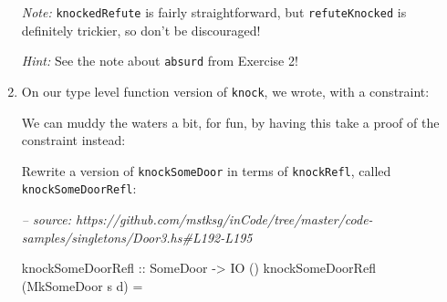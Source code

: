 \documentclass[]{article}
\newenvironment{Shaded}{}{}
\newcommand{\CommentTok}[1]{\textcolor[rgb]{0.38,0.63,0.69}{\textit{#1}}}
\newcommand{\DataTypeTok}[1]{\textcolor[rgb]{0.56,0.13,0.00}{#1}}
\newcommand{\FunctionTok}[1]{\textcolor[rgb]{0.02,0.16,0.49}{#1}}
\newcommand{\NormalTok}[1]{#1}
\newcommand{\OtherTok}[1]{\textcolor[rgb]{0.00,0.44,0.13}{#1}}
\newcommand{\StringTok}[1]{\textcolor[rgb]{0.25,0.44,0.63}{#1}}
\begin{document}
\begin{enumerate}
  \emph{Note:} \texttt{knockedRefute} is fairly straightforward, but
  \texttt{refuteKnocked} is definitely trickier, so don't be discouraged!

  \emph{Hint:} See the note about \texttt{absurd} from Exercise 2!
\item
  On our type level function version of \texttt{knock}, we wrote, with a
  constraint:

\begin{Shaded}
\end{Shaded}

  We can muddy the waters a bit, for fun, by having this take a proof of the
  constraint instead:

\begin{Shaded}
\end{Shaded}

  Rewrite a version of \texttt{knockSomeDoor} in terms of \texttt{knockRefl},
  called \texttt{knockSomeDoorRefl}:

\begin{Shaded}
\begin{Highlighting}[]
\CommentTok{-- source: https://github.com/mstksg/inCode/tree/master/code-samples/singletons/Door3.hs#L192-L195}

\NormalTok{knockSomeDoorRefl}
\OtherTok{    ::} \DataTypeTok{SomeDoor}
    \OtherTok{->} \DataTypeTok{IO}\NormalTok{ ()}
\NormalTok{knockSomeDoorRefl (}\DataTypeTok{MkSomeDoor}\NormalTok{ s d) }\FunctionTok{=}
\end{Highlighting}
\end{Shaded}


\end{enumerate}
\end{document}
